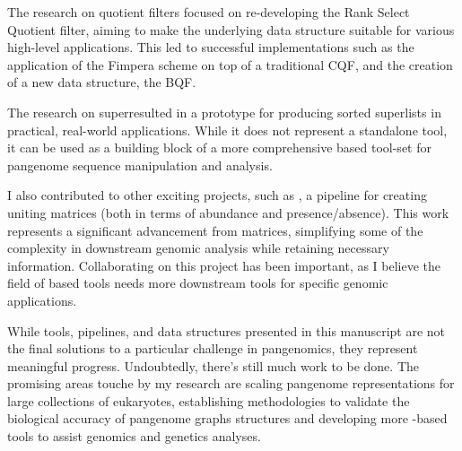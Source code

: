 The research on quotient filters focused on re-developing the Rank Select Quotient filter, aiming to make the underlying data structure suitable for various high-level applications. This led to successful implementations such as the application of the Fimpera scheme on top of a traditional CQF, and the creation of a new data structure, the BQF.

The research on super\kmers resulted in a prototype for producing sorted super\kmer lists in practical, real-world applications. While it does not represent a standalone tool, it can be used as a building block of a more comprehensive \kmer based tool-set for pangenome sequence manipulation and analysis.

I also contributed to other exciting projects, such as \muset, a pipeline for creating uniting matrices (both in terms of abundance and presence/absence). This work represents a significant advancement from \kmer matrices, simplifying some of the complexity in downstream genomic analysis while retaining necessary information. Collaborating on this project has been important, as I believe the field of \kmer based tools needs more downstream tools for specific genomic applications.

While tools, pipelines, and data structures presented in this manuscript are not the final solutions to a particular challenge in pangenomics, they represent meaningful progress. Undoubtedly, there’s still much work to be done. The promising areas touche by my research are scaling pangenome representations for large collections of eukaryotes, establishing methodologies to validate the biological accuracy of pangenome graphs structures and developing more \kmer-based tools to assist genomics and genetics analyses.

